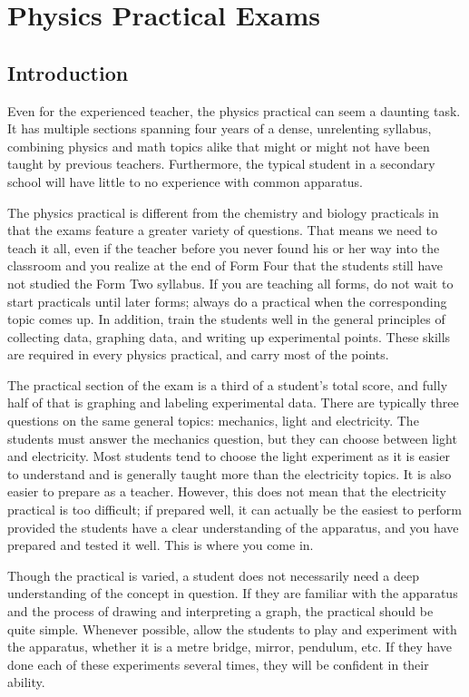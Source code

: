 \chapter{Physics Practical Exams}

\section{Introduction}

Even for the experienced teacher, the physics practical can seem a daunting task.
It has multiple sections spanning four years of a dense, unrelenting syllabus, combining
physics and math topics alike that might or might not have been taught by previous
teachers. Furthermore, the typical student in a secondary school will have little to no
experience with common apparatus.

The physics practical is different from the chemistry and biology practicals in that
the exams feature a greater variety of questions. That means we need to teach it all, even if the teacher before you never found his or her way into the classroom and you realize at the end of Form Four that the students still have not studied the Form Two syllabus. If you are teaching all forms, do not wait to start practicals until later forms; always do a practical when the corresponding topic comes up. In addition, train the students well in the general principles of collecting data, graphing data, and writing up experimental points. These skills are required in every physics practical, and carry most of the points.

The practical section of the exam is a third of a student’s total score, and fully half
of that is graphing and labeling experimental data. There are typically three questions on
the same general topics: mechanics, light and electricity. The students must answer the
mechanics question, but they can choose between light and electricity. Most students tend
to choose the light experiment as it is easier to understand and is generally taught more
than the electricity topics. It is also easier to prepare as a teacher. However, this does not
mean that the electricity practical is too difficult; if prepared well, it can actually be the
easiest to perform provided the students have a clear understanding of the apparatus, and you have prepared and tested it well. This is where you come in.

Though the practical is varied, a student does not necessarily need a deep
understanding of the concept in question. If they are familiar with the apparatus and the
process of drawing and interpreting a graph, the practical should be quite simple.
Whenever possible, allow the students to play and experiment with the apparatus,
whether it is a metre bridge, mirror, pendulum, etc. If they have done each of these experiments several times, they will be confident in their ability.

